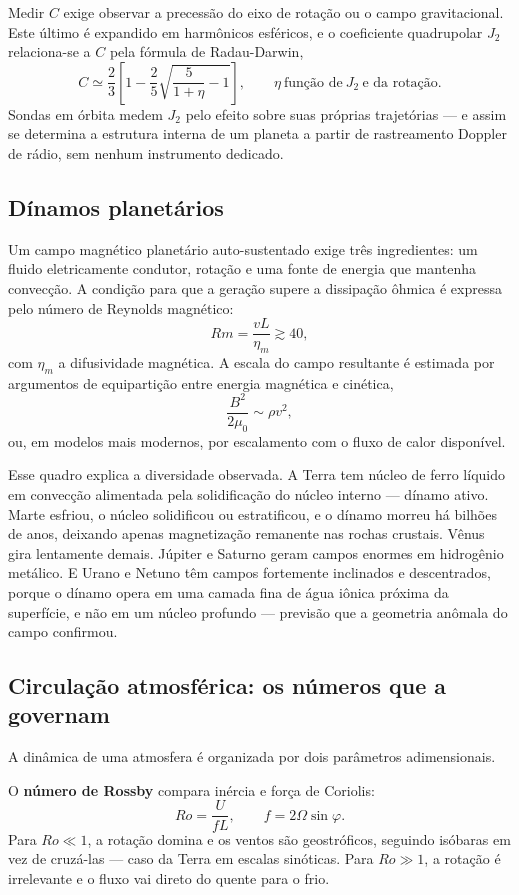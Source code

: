 \documentclass[11pt,a4paper]{article}
\begin{document}
Medir $C$ exige observar a precessão do eixo de rotação ou o campo gravitacional. Este último é expandido em harmônicos esféricos, e o coeficiente quadrupolar $J_2$ relaciona-se a $C$ pela fórmula de Radau-Darwin,
\[
C\simeq\frac{2}{3}\left[1-\frac{2}{5}\sqrt{\frac{5}{1+\eta}-1}\right],
\qquad
\eta\ \text{função de}\ J_2\ \text{e da rotação}.
\]
Sondas em órbita medem $J_2$ pelo efeito sobre suas próprias trajetórias --- e assim se determina a estrutura interna de um planeta a partir de rastreamento Doppler de rádio, sem nenhum instrumento dedicado.

\subsection*{Dínamos planetários}

Um campo magnético planetário auto-sustentado exige três ingredientes: um fluido eletricamente condutor, rotação e uma fonte de energia que mantenha convecção. A condição para que a geração supere a dissipação ôhmica é expressa pelo número de Reynolds magnético:
\[
Rm=\frac{vL}{\eta_m}\gtrsim40,
\]
com $\eta_m$ a difusividade magnética. A escala do campo resultante é estimada por argumentos de equipartição entre energia magnética e cinética,
\[
\frac{B^{2}}{2\mu_0}\sim\rho v^{2},
\]
ou, em modelos mais modernos, por escalamento com o fluxo de calor disponível.

Esse quadro explica a diversidade observada. A Terra tem núcleo de ferro líquido em convecção alimentada pela solidificação do núcleo interno --- dínamo ativo. Marte esfriou, o núcleo solidificou ou estratificou, e o dínamo morreu há bilhões de anos, deixando apenas magnetização remanente nas rochas crustais. Vênus gira lentamente demais. Júpiter e Saturno geram campos enormes em hidrogênio metálico. E Urano e Netuno têm campos fortemente inclinados e descentrados, porque o dínamo opera em uma camada fina de água iônica próxima da superfície, e não em um núcleo profundo --- previsão que a geometria anômala do campo confirmou.

\subsection*{Circulação atmosférica: os números que a governam}

A dinâmica de uma atmosfera é organizada por dois parâmetros adimensionais.

O \textbf{número de Rossby} compara inércia e força de Coriolis:
\[
Ro=\frac{U}{fL},
\qquad
f=2\Omega\sin\varphi.
\]
Para $Ro\ll1$, a rotação domina e os ventos são geostróficos, seguindo isóbaras em vez de cruzá-las --- caso da Terra em escalas sinóticas. Para $Ro\gg1$, a rotação é irrelevante e o fluxo vai direto do quente para o frio.
\end{document}
